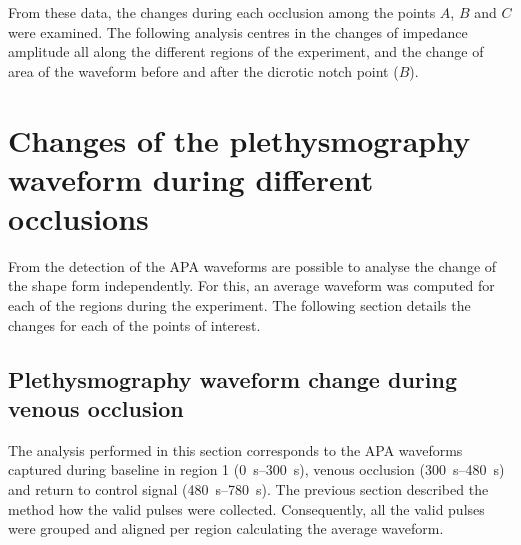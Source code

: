 From these data, the changes during each occlusion among the points $A$, $B$ and $C$  were examined. The following analysis centres in the changes of impedance amplitude all along the different regions of the experiment, and the change of area of the waveform before and after the dicrotic notch point ($B$).


\section{Changes of the plethysmography waveform during different occlusions}
\label{section apa 2}
From the detection of the APA waveforms are possible to analyse the change of the shape form independently. For this, an average waveform was computed for each of the regions during the experiment. The following section details the changes for each of the points of interest. 

\subsection{Plethysmography waveform change during venous occlusion}
\label{section apa 2.1}
The analysis performed in this section corresponds to the APA waveforms captured during baseline in region 1 (\SIrange{0}{300}{\second}), venous occlusion (\SIrange{300}{480}{\second}) and return to control signal (\SIrange{480}{780}{\second}).  The previous section described the method how the valid pulses were collected. Consequently, all the valid pulses were grouped and aligned per region calculating the average waveform.


